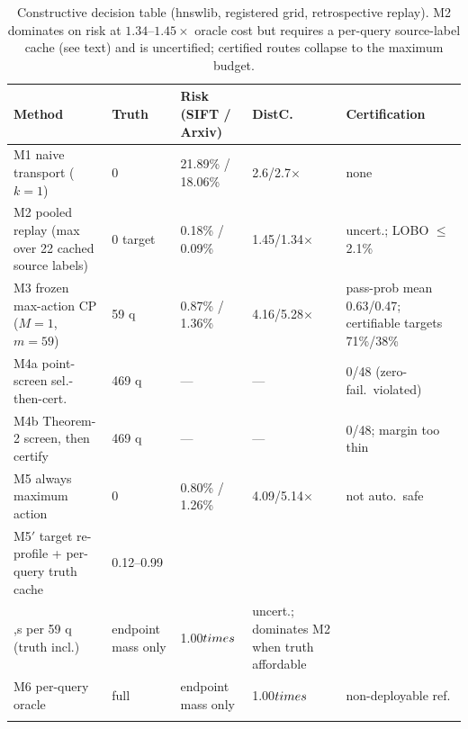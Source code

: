 \documentclass{article}
\begin{document}
\begin{table}[t]
\centering
\caption{Constructive decision table (hnswlib, registered grid, retrospective replay). M2 dominates on risk
at $1.34$--$1.45\times$ oracle cost but requires a per-query source-label cache (see text) and is
uncertified; certified routes collapse to the maximum budget.}
\label{tab:constructive}
\scriptsize
\setlength{\tabcolsep}{2.8pt}
\begin{tabular}{p{3.2cm}p{1.0cm}p{3.0cm}p{1.4cm}p{4.0cm}}
\toprule
Method & Truth & Risk (SIFT / Arxiv) & DistC. & Certification \\
\midrule
M1 naive transport ($k{=}1$) & 0 & 21.89\% / 18.06\% & 2.6/2.7$\times$ & none \\
M2 pooled replay (max over 22 cached source labels) & 0 target & 0.18\% / 0.09\% & 1.45/1.34$\times$ & uncert.; LOBO $\le$2.1\% \\
M3 frozen max-action CP ($M{=}1$, $m{=}59$) & 59 q & 0.87\% / 1.36\% & 4.16/5.28$\times$ & pass-prob mean 0.63/0.47; certifiable targets 71\%/38\% \\
M4a point-screen sel.-then-cert. & 469 q & --- & --- & 0/48 (zero-fail.\ violated) \\
M4b Theorem-2 screen, then certify & 469 q & --- & --- & 0/48; margin too thin \\
M5 always maximum action & 0 & 0.80\% / 1.26\% & 4.09/5.14$\times$ & not auto.\ safe \\
M5$'$ target re-profile + per-query truth cache & 0.12--0.99\\,s per 59 q (truth incl.) & endpoint mass only & 1.00$\\times$ & uncert.; dominates M2 when truth affordable \\
M6 per-query oracle & full & endpoint mass only & 1.00$\\times$ & non-deployable ref. \\\\
\bottomrule
\end{tabular}
\end{table}
\end{document}
